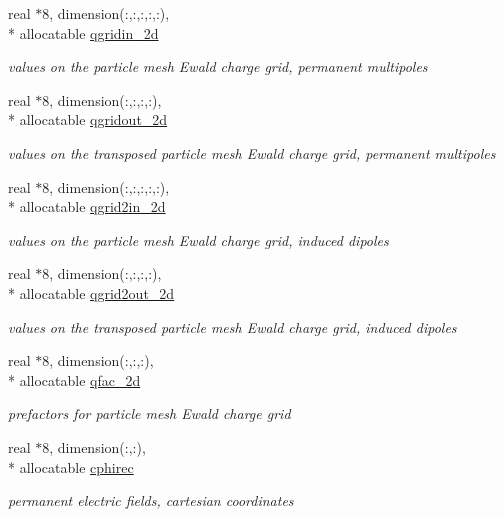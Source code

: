 \begin{DoxyCompactItemize}
real $\ast$8, dimension(\-:,\-:,\-:,\-:,\-:), \\*
allocatable \hyperlink{classpme_ab9bda6ccbc8e57a3a5a0959234b511d3}{qgridin\-\_\-2d}
\begin{DoxyCompactList}\small\item\em values on the particle mesh Ewald charge grid, permanent multipoles \end{DoxyCompactList}\item 
real $\ast$8, dimension(\-:,\-:,\-:,\-:), \\*
allocatable \hyperlink{classpme_a5aee9bc96e7fac94aa9f0773f1fadea1}{qgridout\-\_\-2d}
\begin{DoxyCompactList}\small\item\em values on the transposed particle mesh Ewald charge grid, permanent multipoles \end{DoxyCompactList}\item 
real $\ast$8, dimension(\-:,\-:,\-:,\-:,\-:), \\*
allocatable \hyperlink{classpme_a12be952cd0b3e3fddb1e38a9272c2898}{qgrid2in\-\_\-2d}
\begin{DoxyCompactList}\small\item\em values on the particle mesh Ewald charge grid, induced dipoles \end{DoxyCompactList}\item 
real $\ast$8, dimension(\-:,\-:,\-:,\-:), \\*
allocatable \hyperlink{classpme_a41e685e4c0f36238cb3abf670331f0c6}{qgrid2out\-\_\-2d}
\begin{DoxyCompactList}\small\item\em values on the transposed particle mesh Ewald charge grid, induced dipoles \end{DoxyCompactList}\item 
real $\ast$8, dimension(\-:,\-:,\-:), \\*
allocatable \hyperlink{classpme_a91c3f31f171829c8b5e2ad267040b047}{qfac\-\_\-2d}
\begin{DoxyCompactList}\small\item\em prefactors for particle mesh Ewald charge grid \end{DoxyCompactList}\item 
real $\ast$8, dimension(\-:,\-:), \\*
allocatable \hyperlink{classpme_a670f4635124f83619157e837135deb8c}{cphirec}
\begin{DoxyCompactList}\small\item\em permanent electric fields, cartesian coordinates \end{DoxyCompactList}\item 

\end{DoxyCompactItemize}
